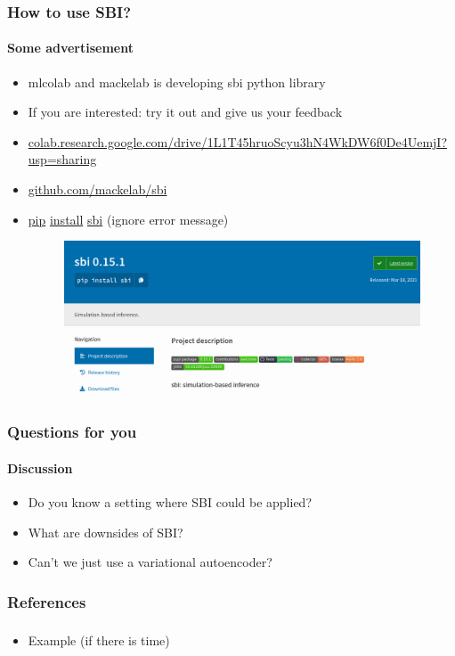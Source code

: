 \documentclass[9pt, aspectratio=169]{beamer}
\begin{document}
\begin{frame}
\frametitle{How to use SBI?}
\framesubtitle{Some advertisement}
\begin{itemize}
	\item mlcolab and mackelab is developing sbi python library \cite{tejero2020sbi}
	\item If you are interested: try it out and give us your feedback
	\item \url{colab.research.google.com/drive/1L1T45hruoScyu3hN4WkDW6f0De4UemjI?usp=sharing}
	\item \url{github.com/mackelab/sbi}
	\item \url{pip} \url{install} \url{sbi} (ignore error message)
		\begin{figure}
		\flushleft
		\includegraphics[width=.5\linewidth]{figures/sbipypi.png}
	\end{figure}
\end{itemize}
\end{frame} 


\begin{frame}
\frametitle{Questions for you}
\framesubtitle{Discussion}
\begin{itemize}
	\item Do you know a setting where SBI could be applied?
	\item What are downsides of SBI?
	\item Can't we just use a variational autoencoder?
\end{itemize}
\end{frame} 




\begin{frame}
\frametitle{References}
\framesubtitle{}

\end{frame} 

\begin{frame}
\frametitle{}
\framesubtitle{}
\begin{itemize}
	\item Example (if there is time)
\end{itemize}
\end{frame} 
\end{document}
